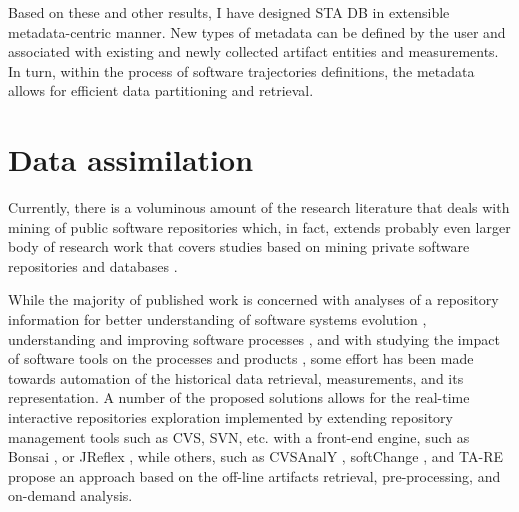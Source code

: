 Based on these and other results, I have designed STA DB in extensible metadata-centric manner. 
New types of metadata can be defined by the user and associated with existing and newly collected artifact entities 
and measurements. In turn, within the process of software trajectories definitions, the metadata allows for efficient 
data partitioning and retrieval.

\section{Data assimilation}
Currently, there is a voluminous amount of the research literature that deals with mining of public software repositories 
\cite{citeulike:2710928} which, in fact, extends probably even larger body of research work that covers studies based on mining 
private software repositories and databases \cite{citeulike:393158} \cite{citeulike:13125375} \cite{citeulike:13125481}.

While the majority of published work is concerned with analyses of a repository information 
for better understanding of software systems evolution \cite{citeulike:277045} \cite{citeulike:4000311}, 
understanding and improving software processes \cite{citeulike:5803126}, 
and with studying the impact of software tools on the processes and products \cite{citeulike:13125389},
some effort has been made towards automation of the historical data retrieval, measurements, and its representation. 
A number of the proposed solutions allows for the real-time interactive repositories exploration implemented by extending 
repository management tools such as CVS, SVN, etc. with a front-end engine, such as Bonsai \cite{bonsai},
or JReflex \cite{citeulike:3017440}, while others, such as CVSAnalY \cite{citeulike:6544724}, 
softChange \cite{citeulike:13125395}, and {TA}-{RE} \cite{citeulike:4000311} propose an approach based on 
the off-line artifacts retrieval, pre-processing, and on-demand analysis.

